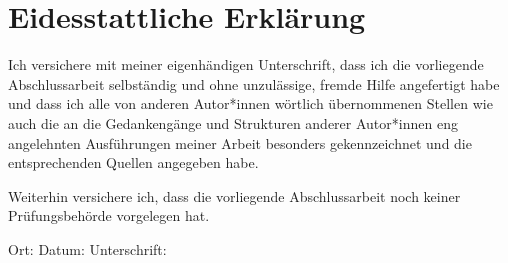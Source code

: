 \chapter*{Eidesstattliche Erklärung}
\label{ch:erklaerung}

\begin{flushleft}
Ich versichere mit meiner eigenhändigen Unterschrift, dass ich die vorliegende Abschlussarbeit selbständig und ohne unzulässige, fremde Hilfe angefertigt habe und dass ich alle von anderen Autor*innen wörtlich übernommenen Stellen wie auch die an die Gedankengänge und Strukturen anderer Autor*innen eng angelehnten Ausführungen meiner Arbeit besonders gekennzeichnet und die entsprechenden Quellen angegeben habe.
\end{flushleft}

\begin{flushleft}
Weiterhin versichere ich, dass die vorliegende Abschlussarbeit noch keiner Prüfungsbehörde vorgelegen hat.
\end{flushleft}

Ort: \hrulefill\enspace Datum:	\hrulefill\enspace Unterschrift: \hrulefill
\\[3.5cm]